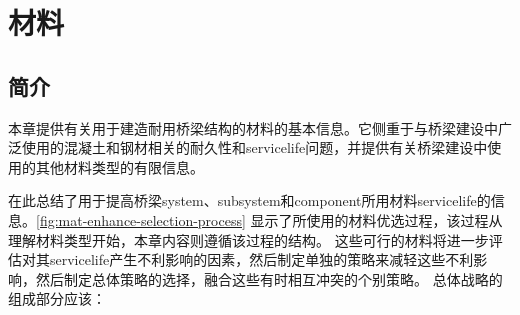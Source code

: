 \chapter{材料}
\label{chp:materials}
\section{简介}
本章提供有关用于建造耐用桥梁结构的材料的基本信息。它侧重于与桥梁建设中广泛使用的混凝土和钢材相关的耐久性和\gls*{servicelife}问题，并提供有关桥梁建设中使用的其他材料类型的有限信息。

在此总结了用于提高桥梁\gls*{system}、\gls*{subsystem}和\gls*{component}所用材料\gls*{servicelife}的信息。\cref{fig:mat-enhance-selection-process} 显示了所使用的材料优选过程，该过程从理解材料类型开始，本章内容则遵循该过程的结构。 这些可行的材料将进一步评估对其\gls*{servicelife}产生不利影响的因素，然后制定单独的策略来减轻这些不利影响，然后制定总体策略的选择，融合这些有时相互冲突的个别策略。 总体战略的组成部分应该：

